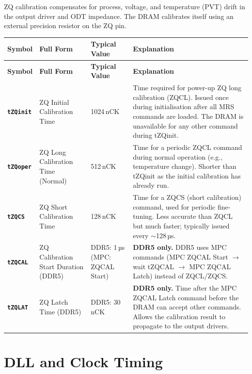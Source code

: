 \documentclass[11pt,a4paper]{article}
\newcommand{\sym}[1]{\texttt{\textbf{#1}}}
\begin{document}
ZQ calibration compensates for process, voltage, and temperature (PVT) drift in
the output driver and ODT impedance. The DRAM calibrates itself using an external
precision resistor on the ZQ pin.

\begin{longtable}{L{2.2cm} L{4.8cm} L{3.5cm} L{4cm}}
\toprule
\textbf{Symbol} & \textbf{Full Form} & \textbf{Typical Value} & \textbf{Explanation} \\
\midrule
\endfirsthead
\toprule
\textbf{Symbol} & \textbf{Full Form} & \textbf{Typical Value} & \textbf{Explanation} \\
\midrule
\endhead
\bottomrule
\endfoot

\sym{tZQinit} & ZQ Initial Calibration Time & 1024\,nCK &
  Time required for power-up ZQ long calibration (ZQCL).
  Issued once during initialisation after all MRS commands are loaded.
  The DRAM is unavailable for any other command during tZQinit. \\

\sym{tZQoper} & ZQ Long Calibration Time (Normal) & 512\,nCK &
  Time for a periodic ZQCL command during normal operation (e.g., temperature change).
  Shorter than tZQinit as the initial calibration has already run. \\

\sym{tZQCS} & ZQ Short Calibration Time & 128\,nCK &
  Time for a ZQCS (short calibration) command, used for periodic fine-tuning.
  Less accurate than ZQCL but much faster; typically issued every $\sim$128\,µs. \\

\sym{tZQCAL} & ZQ Calibration Start Duration (DDR5) & DDR5: 1\,µs (MPC: ZQCAL Start) &
  \textbf{DDR5 only.} DDR5 uses MPC commands (MPC ZQCAL Start $\rightarrow$ wait tZQCAL 
  $\rightarrow$ MPC ZQCAL Latch) instead of ZQCL/ZQCS. \\

\sym{tZQLAT} & ZQ Latch Time (DDR5) & DDR5: 30\,nCK &
  \textbf{DDR5 only.} Time after the MPC ZQCAL Latch command before the DRAM can accept
  other commands. Allows the calibration result to propagate to the output drivers. \\
\end{longtable}

\section{DLL and Clock Timing}
\end{document}
